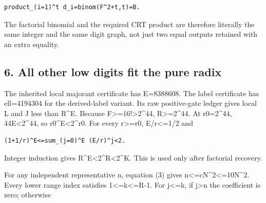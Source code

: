 \begin{verbatim}
product_(i=1)^t d_i=binom(F^2+t,t)=B.
\end{verbatim}

The factorial binomial and the required CRT product are therefore literally the same integer and the same digit graph, not just two equal outputs retained with an extra equality.



\subsection*{6. All other low digits fit the pure radix}



The inherited local majorant certificate has E=\allowbreak{}8388608. The label certificate has ell=\allowbreak{}4194304 for the derived-label variant. Its raw positive-gate ledger gives local L and J less than R\textasciicircum{}\allowbreak{}E. Because F\textgreater{}\allowbreak{}=\allowbreak{}16!\textgreater{}\allowbreak{}2\textasciicircum{}\allowbreak{}44, R\textgreater{}\allowbreak{}=\allowbreak{}2\textasciicircum{}\allowbreak{}44. At r0=\allowbreak{}2\textasciicircum{}\allowbreak{}44, 44E\textless{}\allowbreak{}2\textasciicircum{}\allowbreak{}44, so r0\textasciicircum{}\allowbreak{}E\textless{}\allowbreak{}2\textasciicircum{}\allowbreak{}r0. For every r\textgreater{}\allowbreak{}=\allowbreak{}r0, E/\allowbreak{}r\textless{}\allowbreak{}=\allowbreak{}1/\allowbreak{}2 and



\begin{verbatim}
(1+1/r)^E<=sum_(j=0)^E (E/r)^j<2.
\end{verbatim}

Integer induction gives R\textasciicircum{}\allowbreak{}E\textless{}\allowbreak{}2\textasciicircum{}\allowbreak{}R\textless{}\allowbreak{}2\textasciicircum{}\allowbreak{}K. This is used only after factorial recovery.



For any independent representative n, equation (3) gives n\textless{}\allowbreak{}=\allowbreak{}cN\textasciicircum{}\allowbreak{}2\textless{}\allowbreak{}=\allowbreak{}10N\textasciicircum{}\allowbreak{}2. Every lower range index satisfies 1\textless{}\allowbreak{}=\allowbreak{}k\textless{}\allowbreak{}=\allowbreak{}R-1. For j\textless{}\allowbreak{}=\allowbreak{}k, if j\textgreater{}\allowbreak{}n the coefficient is zero; otherwise



